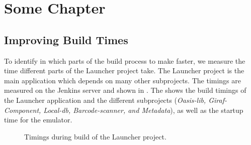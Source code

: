 

\chapter{Some Chapter}
\section{Improving Build Times}

To identify in which parts of the build process to make faster, we measure the time different parts of the Launcher project take. The Launcher project is the main application which depends on many other subprojects. The timings are measured on the Jenkins server and shown in . The shows the build timings of the Launcher application and the different subprojects (\emph{Oasis-lib, Giraf-Component, Local-db, Barcode-scanner, and Metadata}), as well as the startup time for the emulator.

\begin{figure}
\caption{Timings during build of the Launcher project.}\label{fig:launcher_build_times}
\end{figure}